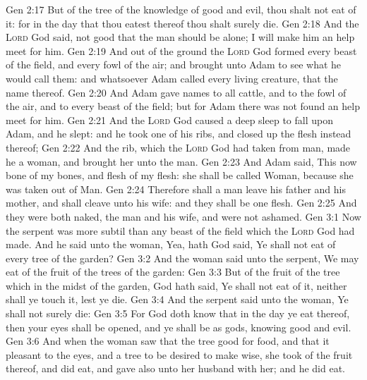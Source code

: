 \vs Gen 2:17 But of the tree of the knowledge of good and evil, thou shalt not eat of it: for in the day that thou eatest thereof thou shalt surely die.
\vs Gen 2:18 And the \textsc{Lord} God said,  not good that the man should be alone; I will make him an help meet for him.
\vs Gen 2:19 And out of the ground the \textsc{Lord} God formed every beast of the field, and every fowl of the air; and brought  unto Adam to see what he would call them: and whatsoever Adam called every living creature, that  the name thereof.
\vs Gen 2:20 And Adam gave names to all cattle, and to the fowl of the air, and to every beast of the field; but for Adam there was not found an help meet for him.
\vs Gen 2:21 And the \textsc{Lord} God caused a deep sleep to fall upon Adam, and he slept: and he took one of his ribs, and closed up the flesh instead thereof;
\vs Gen 2:22 And the rib, which the \textsc{Lord} God had taken from man, made he a woman, and brought her unto the man.
\vs Gen 2:23 And Adam said, This  now bone of my bones, and flesh of my flesh: she shall be called Woman, because she was taken out of Man.
\vs Gen 2:24 Therefore shall a man leave his father and his mother, and shall cleave unto his wife: and they shall be one flesh.
\vs Gen 2:25 And they were both naked, the man and his wife, and were not ashamed.
\vs Gen 3:1 Now the serpent was more subtil than any beast of the field which the \textsc{Lord} God had made. And he said unto the woman, Yea, hath God said, Ye shall not eat of every tree of the garden?
\vs Gen 3:2 And the woman said unto the serpent, We may eat of the fruit of the trees of the garden:
\vs Gen 3:3 But of the fruit of the tree which  in the midst of the garden, God hath said, Ye shall not eat of it, neither shall ye touch it, lest ye die.
\vs Gen 3:4 And the serpent said unto the woman, Ye shall not surely die:
\vs Gen 3:5 For God doth know that in the day ye eat thereof, then your eyes shall be opened, and ye shall be as gods, knowing good and evil.
\vs Gen 3:6 And when the woman saw that the tree  good for food, and that it  pleasant to the eyes, and a tree to be desired to make  wise, she took of the fruit thereof, and did eat, and gave also unto her husband with her; and he did eat.
